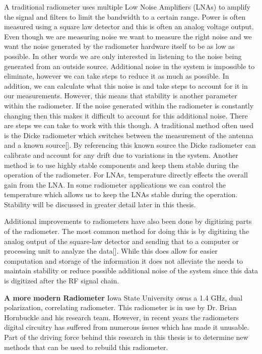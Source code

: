 A traditional radiometer uses multiple Low Noise Amplifiers (LNAs) to amplify the signal and filters to limit the bandwidth to a certain range.  Power is often measured using a square law detector and this is often an analog voltage output.  Even though we are measuring noise we want to measure the right noise and we want the noise generated by the radiometer hardware itself to be as low as possible.  In other words we are only interested in listening to the noise being generated from an outside source.  Additional noise in the system is impossible to eliminate, however we can take steps to reduce it as much as possible.  In addition, we can calculate what this noise is and take steps to account for it in our measurements.  However, this means that stability is another parameter within the radiometer.  If the noise generated within the radiometer is constantly changing then this makes it difficult to account for this additional noise.  There are steps we can take to work with this though.  A traditional method often used is the Dicke radiometer which switches between the measurement of the antenna and a known source[\cite{Dicke}].  By referencing this known source the Dicke radiometer can calibrate and account for any drift due to variations in the system.  Another method is to use highly stable components and keep them stable during the operation of the radiometer.  For LNAs, temperature directly effects the overall gain from the LNA.  In some radiometer applications we can control the temperature which allows us to keep the LNAs stable during the operation.  Stability will be discussed in greater detail later in this thesis.

Additional improvements to radiometers have also been done by digitizing parts of the radiometer.  The most common method for doing this is by digitizing the analog output of the square-law detector and sending that to a computer or processing unit to analyze the data[\cite{Bremer}].  While this does allow for easier computation and storage of the information it does not alleviate the needs to maintain stability or reduce possible additional noise of the system since this data is digitized after the RF signal chain.

\textbf{A more modern Radiometer}  
Iowa State University owns a 1.4 GHz, dual polarization, correlating radiometer.  This radiometer is in use by Dr. Brian Hornbuckle and his research team.  However, in recent years the radiometers digital circuitry has suffered from numerous issues which has made it unusable.  Part of the driving force behind this research in this thesis is to determine new methods that can be used to rebuild this radiometer.

